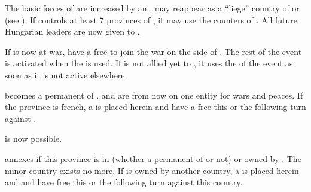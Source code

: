 


\effetlong
\aparag The basic forces of \HAB are increased by an \ARMY\facemoins.
\aparag \paysHongrie may reappear as a ``liege'' country of \HAB or \SPA (see
). %
\aparag If \HAB controls at least 7 provinces of \paysHongrie, it may use the
counters of \paysHongrie.
\aparag All future Hungarian leaders are now given to \HAB.





\aparag If \paysMilan is now at war, \HAB have a free \CB to join the war on
the side of \paysMilan. The rest of the event is activated when the \CB is
used.
\aparag If \HAB is not allied yet to \SPA, it uses the \CB of the event as
soon as it is not active elsewhere.

\phevnt
\aparag \paysMilan becomes a permanent \VASSAL of \HAB. \paysMilan and \HAB
are from now on one entity for wars and peaces.
\aparag If the province \provinceLombardia is french, a \REVOLT \facemoins is
placed herein and \HAB have a free \CB this or the following turn against
\FRA.

\effetlong
\aparag {} is now possible.






\phevnt
\aparag \SPA annexes \provinceLombardia if this province is in \paysMilan
(whether a permanent \VASSAL of \HAB or not) or owned by \HAB. The minor
country \paysMilan exists no more.
\aparag If \provinceLombardia is owned by another country, a \REVOLT
\facemoins is placed herein and \SPA and \HAB have free \CB this or the
following turn against this country.

